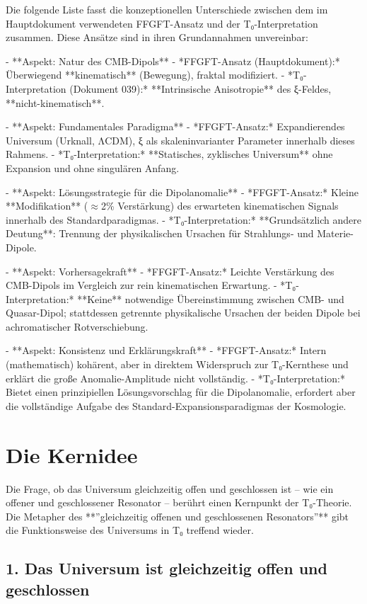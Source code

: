 Die folgende Liste fasst die konzeptionellen Unterschiede zwischen dem im Hauptdokument verwendeten FFGFT-Ansatz und der T₀-Interpretation zusammen. Diese Ansätze sind in ihren Grundannahmen unvereinbar:

- **Aspekt: Natur des CMB-Dipols**
- *FFGFT-Ansatz (Hauptdokument):* Überwiegend **kinematisch** (Bewegung), fraktal modifiziert.
- *T₀-Interpretation (Dokument 039):* **Intrinsische Anisotropie** des ξ-Feldes, **nicht-kinematisch**.

- **Aspekt: Fundamentales Paradigma**
- *FFGFT-Ansatz:* Expandierendes Universum (Urknall, ΛCDM), ξ als skaleninvarianter Parameter innerhalb dieses Rahmens.
- *T₀-Interpretation:* **Statisches, zyklisches Universum** ohne Expansion und ohne singulären Anfang.

- **Aspekt: Lösungsstrategie für die Dipolanomalie**
- *FFGFT-Ansatz:* Kleine **Modifikation** ($\approx$2\% Verstärkung) des erwarteten kinematischen Signals innerhalb des Standardparadigmas.
- *T₀-Interpretation:* **Grundsätzlich andere Deutung**: Trennung der physikalischen Ursachen für Strahlungs- und Materie-Dipole.

- **Aspekt: Vorhersagekraft**
- *FFGFT-Ansatz:* Leichte Verstärkung des CMB-Dipols im Vergleich zur rein kinematischen Erwartung.
- *T₀-Interpretation:* **Keine** notwendige Übereinstimmung zwischen CMB- und Quasar-Dipol; stattdessen getrennte physikalische Ursachen der beiden Dipole bei achromatischer Rotverschiebung.

- **Aspekt: Konsistenz und Erklärungskraft**
- *FFGFT-Ansatz:* Intern (mathematisch) kohärent, aber in direktem Widerspruch zur T₀-Kernthese und erklärt die große Anomalie-Amplitude nicht vollständig.
- *T₀-Interpretation:* Bietet einen prinzipiellen Lösungsvorschlag für die Dipolanomalie, erfordert aber die vollständige Aufgabe des Standard-Expansionsparadigmas der Kosmologie.

\section*{Die Kernidee}

Die Frage, ob das Universum gleichzeitig offen und geschlossen ist – wie ein offener und geschlossener Resonator – berührt einen Kernpunkt der T₀-Theorie. Die Metapher des **''gleichzeitig offenen und geschlossenen Resonators''** gibt die Funktionsweise des Universums in T₀ treffend wieder.

\subsection*{1. Das Universum ist gleichzeitig offen und geschlossen}

